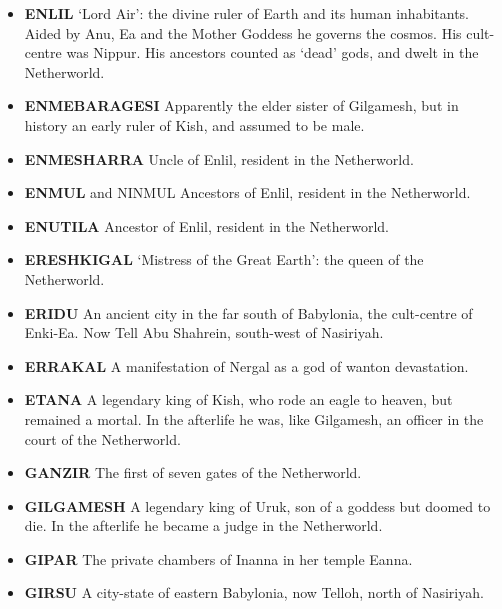\documentclass{article}
\begin{document}
\begin{multicols}{3}
\begin{small}
\begin{itemize}[
        label=,
        leftmargin=1.0em,
        itemindent=-1.0em,
        nosep,
    ]
    \item \textbf{ENLIL}
    `Lord Air': the divine ruler of Earth and its human inhabitants. Aided
    by Anu, Ea and the Mother Goddess he governs the cosmos. His cult-centre
    was Nippur. His ancestors counted as `dead' gods, and dwelt in the
    Netherworld.

    \item \textbf{ENMEBARAGESI}
    Apparently the elder sister of Gilgamesh, but in history an early ruler
    of Kish, and assumed to be male.

    \item \textbf{ENMESHARRA}
    Uncle of Enlil, resident in the Netherworld.

    \item \textbf{ENMUL}
    and NINMUL Ancestors of Enlil, resident in the Netherworld.

    \item \textbf{ENUTILA}
    Ancestor of Enlil, resident in the Netherworld.

    \item \textbf{ERESHKIGAL}
    `Mistress of the Great Earth': the queen of the Netherworld.

    \item \textbf{ERIDU}
    An ancient city in the far south of Babylonia, the cult-centre of
    Enki-Ea. Now Tell Abu Shahrein, south-west of Nasiriyah.

    \item \textbf{ERRAKAL}
    A manifestation of Nergal as a god of wanton devastation.

    \item \textbf{ETANA}
    A legendary king of Kish, who rode an eagle to heaven, but remained a
    mortal. In the afterlife he was, like Gilgamesh, an officer in the court
    of the Netherworld.

    \item \textbf{GANZIR}
    The first of seven gates of the Netherworld.

    \item \textbf{GILGAMESH}
    A legendary king of Uruk, son of a goddess but doomed to die. In the
    afterlife he became a judge in the Netherworld.

    \item \textbf{GIPAR}
    The private chambers of Inanna in her temple Eanna.

    \item \textbf{GIRSU}
    A city-state of eastern Babylonia, now Telloh, north of Nasiriyah.


\end{itemize}
\end{small}
\end{multicols}
\end{document}
